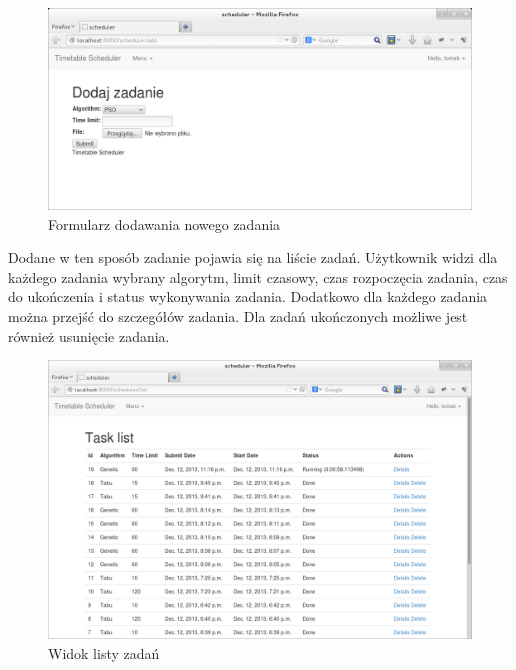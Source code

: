 \begin{figure}[H]
\centering
\includegraphics[width=15cm]{img/guide/user4.png}
\caption{Formularz dodawania nowego zadania}
\end{figure}
\par Dodane w ten sposób zadanie pojawia się na liście zadań. Użytkownik widzi dla każdego zadania wybrany algorytm, limit czasowy, czas rozpoczęcia zadania, czas do ukończenia i status wykonywania zadania. Dodatkowo dla każdego zadania można przejść do szczegółów zadania. Dla zadań ukończonych możliwe jest również usunięcie zadania.

\begin{figure}[H]
\centering
\includegraphics[width=13cm]{img/guide/user5.png}
\caption{Widok listy zadań}
\end{figure}


